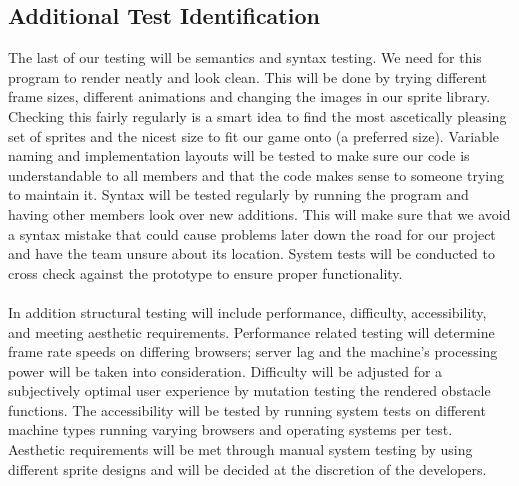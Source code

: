 \documentclass[11pt, oneside]{article}   	%
\begin{document}
\subsection{Additional Test Identification}
The last of our testing will be semantics and syntax testing. We need for this program to render neatly and look clean. This will be done by trying different frame sizes, different animations and changing the images in our sprite library. Checking this fairly regularly is a smart idea to find the most ascetically pleasing set of sprites and the nicest size to fit our game onto (a preferred size). Variable naming and implementation layouts will be tested to make sure our code is understandable to all members and that the code makes sense to someone trying to maintain it. Syntax will be tested regularly by running the program and having other members look over new additions. This will make sure that we avoid a syntax mistake that could cause problems later down the road for our project and have the team unsure about its location. System tests will be conducted to cross check against the prototype to ensure proper functionality.\\
\\
In addition structural testing will include performance, difficulty, accessibility, and meeting aesthetic requirements. Performance related testing will determine frame rate speeds on differing browsers; server lag and the machine's processing power will be taken into consideration. Difficulty will be adjusted for a subjectively optimal user experience by mutation testing the rendered obstacle functions. The accessibility will be tested by running system tests on different machine types running varying browsers and operating systems per test. Aesthetic requirements will be met through manual system testing by using different sprite designs and will be decided at the discretion of the developers.
\end{document}
